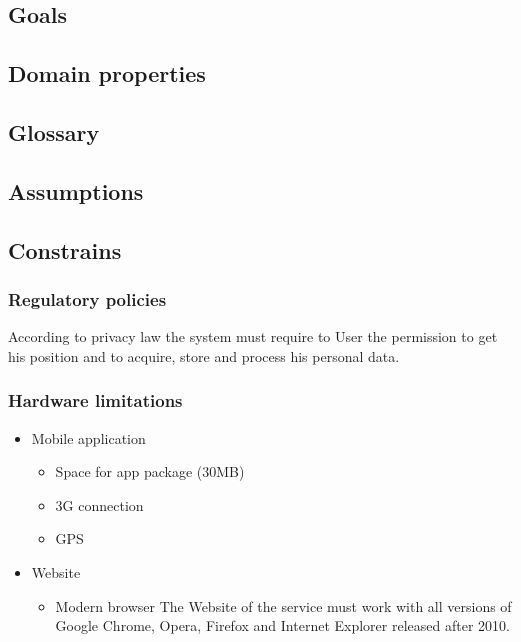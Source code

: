 \documentclass{article}
\begin{document}
		\subsection{Goals}
		

		\subsection{Domain properties}
		

		\subsection{Glossary}
		

		\subsection{Assumptions}
		

		\subsection{Constrains}
			\subsubsection{Regulatory policies}
				According to privacy law the system must require to User the permission to get his position and to acquire, store and process his personal data.
			
			\subsubsection{Hardware limitations}
				\begin{itemize}
				\item Mobile application
				\begin{itemize}
				\item Space for app package (30MB)	
				\item 3G connection
				\item GPS
				\end{itemize}
				\item Website
				\begin{itemize}
					\item Modern browser
				The Website of the service must work with all versions of Google Chrome, Opera, Firefox and Internet Explorer released after 2010.	
				\end{itemize}
				\end{itemize}
\end{document}
